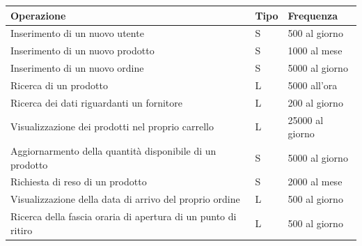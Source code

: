 \documentclass[10pt]{article}
\begin{document}
\begin{center}
    
    \begin{tabularx}{\textwidth} {
        | >{\raggedright\arraybackslash}X |
          >{\raggedright\arraybackslash}X |
          >{\raggedright\arraybackslash}X |
    }

    \hline
    \textbf{Operazione} & \textbf{Tipo} & \textbf{Frequenza} \\
    \hline\hline

    Inserimento di un nuovo utente &
    S &
    500 al giorno \\
    \hline

    Inserimento di un nuovo prodotto &
    S &
    1000 al mese \\
    \hline

    Inserimento di un nuovo ordine &
    S &
    5000 al giorno \\
    \hline

    Ricerca di un prodotto &
    L &
    5000 all'ora \\
    \hline

    Ricerca dei dati riguardanti un fornitore &
    L &
    200 al giorno \\
    \hline

    Visualizzazione dei prodotti nel proprio carrello &
    L &
    25000 al giorno \\
    \hline

    Aggiornarmento della quantità disponibile di un prodotto &
    S &
    5000 al giorno \\
    \hline

    Richiesta di reso di un prodotto  &
    S &
    2000 al mese \\
    \hline

    Visualizzazione della data di arrivo del proprio ordine &
    L &
    500 al giorno \\
    \hline

    Ricerca della fascia oraria di apertura di un punto di ritiro &
    L &
    500 al giorno \\
    \hline
    
    \end{tabularx}
\end{center}
\end{document}
